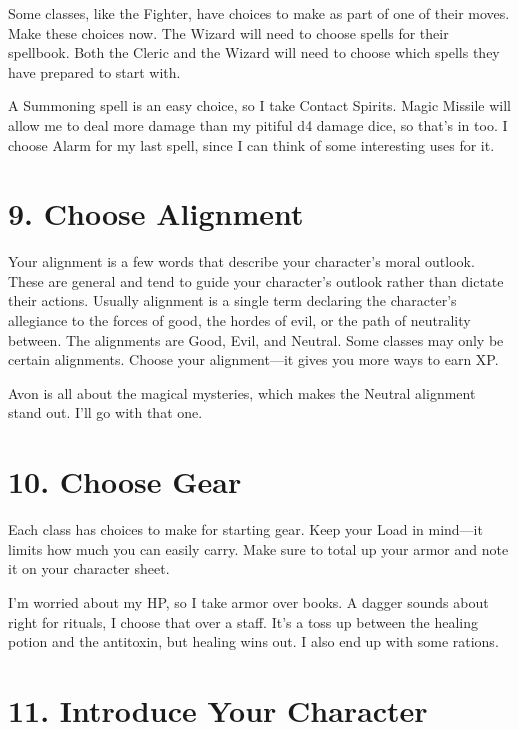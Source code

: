 Some classes, like the Fighter, have choices to make as part of one of their moves. Make these choices now. The Wizard will need to choose spells for their spellbook. Both the Cleric and the Wizard will need to choose which spells they have prepared to start with.

       
\startExample
A Summoning spell is an easy choice, so I take Contact Spirits. Magic Missile will allow me to deal more damage than my pitiful d4 damage dice, so that's in too. I choose Alarm for my last spell, since I can think of some interesting uses for it.
\stopExample
       
\section{9. Choose Alignment}     
       

Your alignment is a few words that describe your character's moral outlook. These are general and tend to guide your character's outlook rather than dictate their actions. Usually alignment is a single term declaring the character's allegiance to the forces of good, the hordes of evil, or the path of neutrality between. The alignments are Good, Evil, and Neutral. Some classes may only be certain alignments. Choose your alignment—it gives you more ways to earn XP.

       
\startExample
Avon is all about the magical mysteries, which makes the Neutral alignment stand out. I'll go with that one.
\stopExample
       
\section{10. Choose Gear}     
       

Each class has choices to make for starting gear. Keep your Load in mind—it limits how much you can easily carry. Make sure to total up your armor and note it on your character sheet.

       
\startExample
I'm worried about my HP, so I take armor over books. A dagger sounds about right for rituals, I choose that over a staff. It's a toss up between the healing potion and the antitoxin, but healing wins out. I also end up with some rations.
\stopExample
       
\section{11. Introduce Your Character}     
       


